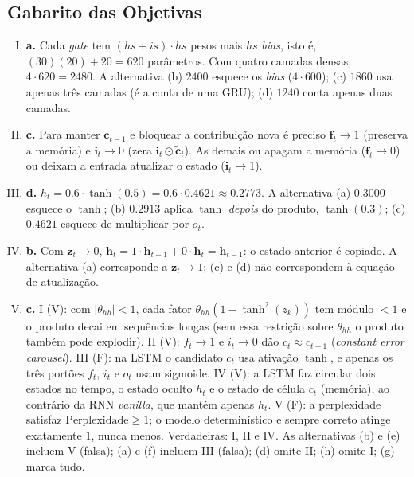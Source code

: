 \documentclass{dlproblemset}
\begin{document}
\begin{enumerate}[I)]
\end{enumerate}

\subsection*{Gabarito das Objetivas}
\color{blue}
\begin{enumerate}[I)]
    \item \textbf{a.} Cada \textit{gate} tem $(hs+is)\cdot hs$ pesos mais $hs$ \textit{bias},
    isto é, $(30)(20) + 20 = 620$ parâmetros. Com quatro camadas densas,
    $4 \cdot 620 = 2480$. A alternativa (b) $2400$ esquece os \textit{bias}
    ($4 \cdot 600$); (c) $1860$ usa apenas três camadas (é a conta de uma GRU); (d) $1240$
    conta apenas duas camadas.
    \item \textbf{c.} Para manter $\mathbf{c}_{t-1}$ e bloquear a contribuição nova é preciso
    $\mathbf{f}_t \to 1$ (preserva a memória) e $\mathbf{i}_t \to 0$ (zera $\mathbf{i}_t \odot \tilde{\mathbf{c}}_t$). As demais
    ou apagam a memória ($\mathbf{f}_t \to 0$) ou deixam a entrada atualizar o estado ($\mathbf{i}_t \to 1$).
    \item \textbf{d.} $h_t = 0.6 \cdot \tanh(0.5) = 0.6 \cdot 0.4621 \approx 0.2773$.
    A alternativa (a) $0.3000$ esquece o $\tanh$; (b) $0.2913$ aplica $\tanh$ \emph{depois}
    do produto, $\tanh(0.3)$; (c) $0.4621$ esquece de multiplicar por $o_t$.
    \item \textbf{b.} Com $\mathbf{z}_t \to 0$, $\mathbf{h}_t = 1 \cdot \mathbf{h}_{t-1} + 0 \cdot \tilde{\mathbf{h}}_t = \mathbf{h}_{t-1}$:
    o estado anterior é copiado. A alternativa (a) corresponde a $\mathbf{z}_t \to 1$; (c) e (d) não
    correspondem à equação de atualização.
    \item \textbf{c.} I (V): com $|\theta_{hh}| < 1$, cada fator $\theta_{hh}(1 - \tanh^2(z_k))$ tem módulo $< 1$ e o produto decai em sequências longas (sem essa restrição sobre $\theta_{hh}$ o produto também pode explodir). II (V): $f_t \to 1$ e $i_t \to 0$ dão $c_t \approx c_{t-1}$ (\textit{constant error carousel}). III (F): na LSTM o candidato $\tilde{c}_t$ usa ativação $\tanh$, e apenas os três portões $f_t$, $i_t$ e $o_t$ usam sigmoide. IV (V): a LSTM faz circular dois estados no tempo, o estado oculto $h_t$ e o estado de célula $c_t$ (memória), ao contrário da RNN \textit{vanilla}, que mantém apenas $h_t$. V (F): a perplexidade satisfaz $\text{Perplexidade} \ge 1$; o modelo determinístico e sempre correto atinge exatamente $1$, nunca menos. Verdadeiras: I, II e IV. As alternativas (b) e (e) incluem V (falsa); (a) e (f) incluem III (falsa); (d) omite II; (h) omite I; (g) marca tudo.

\end{enumerate}
\end{document}
